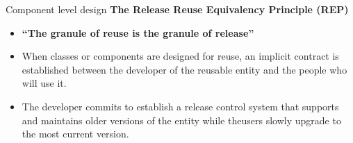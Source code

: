 \documentclass{beamer}
\begin{document}
\begin{frame}{Component level design }
	\textbf{The Release Reuse Equivalency Principle (REP)}
	\begin{itemize}
		\item \textbf{“The granule of reuse is the granule of release”}
		\item When classes or components are designed for reuse, an implicit contract is 
		established between the developer of the reusable entity and the people who 
		will use it.
		\item The developer commits to establish a release control system that supports
		and maintains older versions of the entity while theusers slowly upgrade to
		the most current version. 
	\end{itemize}
\end{frame}
\end{document}
